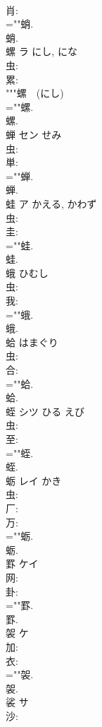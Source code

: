 \documentclass[8pt]{extreport}
\begin{document}
\begin{CJK}{UTF8}{min}
\\	肖: 
\\	=""蛸.
\\	蛸.
\\	螺	ラ	にし, にな		
\\	虫: 
\\	累: 
\\	"""螺　(にし) 
\\	=""螺.
\\	螺.
\\	蝉	セン	せみ		
\\	虫: 
\\	単: 
\\	=""蝉.
\\	蝉.
\\	蛙	ア	かえる, かわず		
\\	虫: 
\\	圭: 
\\	=""蛙.
\\	蛙.
\\	蛾		ひむし				
\\	虫: 
\\	我: 
\\	=""蛾.
\\	蛾.
\\	蛤		はまぐり				
\\	虫: 
\\	合: 
\\	=""蛤.
\\	蛤.
\\	蛭	シツ	ひる	えび	
\\	虫: 
\\	至: 
\\	=""蛭.
\\	蛭.
\\	蛎	レイ	かき		
\\	虫: 
\\	厂: 
\\	万: 
\\	=""蛎.
\\	蛎.
\\	罫	ケイ			
\\	网: 
\\	卦: 
\\	=""罫.
\\	罫.
\\	袈	ケ			
\\	加: 
\\	衣: 
\\	=""袈.
\\	袈.
\\	裟	サ			
\\	沙: 

\end{CJK}
\end{document}
